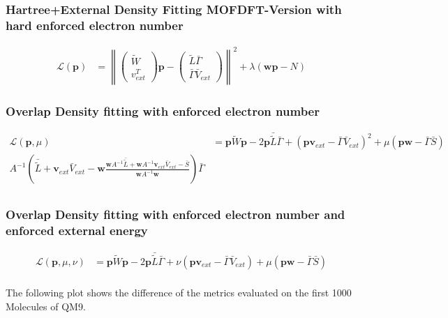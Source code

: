 \subsubsection{Hartree+External Density Fitting MOFDFT-Version with hard enforced electron number}
\begin{align}
    \mathcal{L}(\mathbf{p}) &= \left\lVert\left(\begin{array}{c}\tilde{W}\\v_{ext}^T\end{array}\right) \mathbf{p} - \left(\begin{array}{c}\tilde{L} \bar{\Gamma} \\ \bar{\Gamma}\bar{V}_{ext}\end{array}\right)\right\rVert^2 + \lambda (\mathbf{w}\mathbf{p}-N)
\end{align}



\subsubsection{Overlap Density fitting with enforced electron number}
\begin{align}
    \mathcal{L}(\mathbf{p},\mu) &= \mathbf{p} \tilde{W} \mathbf{p} - 2 \mathbf{p}\bar {\tilde L} \bar\Gamma + (\mathbf{p}\mathbf{v}_{ext}-\bar\Gamma \bar{V}_{ext})^2+\mu(\mathbf{p}\mathbf{w}-\bar\Gamma\bar S)\\
    A^{-1}\left(\bar {\tilde L} + \mathbf{v}_{ext} \bar{V}_{ext}- \mathbf{w}\frac{\mathbf{w}A^{-1}\bar {\tilde L} +\mathbf{w}A^{-1}\mathbf{v}_{ext} \bar{V}_{ext}-\bar S}{\mathbf{w}A^{-1}\mathbf{w}}\right)\bar\Gamma\\
\end{align}



\subsubsection{Overlap Density fitting with enforced electron number and enforced external energy}
\begin{align}
    \mathcal{L}(\mathbf{p},\mu,\nu) &= \mathbf{p} \tilde{W} \mathbf{p} - 2 \mathbf{p}\bar {\tilde L} \bar\Gamma + \nu(\mathbf{p}\mathbf{v}_{ext}-\bar\Gamma \bar{V}_{ext})+\mu(\mathbf{p}\mathbf{w}-\bar\Gamma\bar S)\\
\end{align}

The following plot shows the difference of the metrics evaluated on the first 1000 Molecules of QM9.


